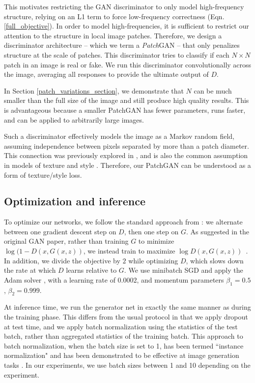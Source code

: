 This motivates restricting the GAN discriminator to only model high-frequency structure, relying on an L1 term to force low-frequency correctness (Eqn. \ref{full_objective}). In order to model high-frequencies, it is sufficient to restrict our attention to the structure in local image patches. Therefore, we design a discriminator architecture -- which we term a \emph{Patch}GAN -- that only penalizes structure at the scale of patches. This discriminator tries to classify if each $N \times N$ patch in an image is real or fake. We run this discriminator convolutionally across the image, averaging all responses to provide the ultimate output of $D$.

In Section \ref{patch_variations_section}, we demonstrate that $N$ can be much smaller than the full size of the image and still produce high quality results. This is advantageous because a smaller PatchGAN has fewer parameters, runs faster, and can be applied to arbitrarily large images.

Such a discriminator effectively models the image as a Markov random field, assuming independence between pixels separated by more than a patch diameter. This connection was previously explored in \cite{li2016precomputed}, and is also the common assumption in models of texture \cite{efros1999texture,gatys2015texture} and style \cite{efros2001image,hertzmann2001image,gatys2015neural,li2016combining}. Therefore, our PatchGAN can be understood as a form of texture/style loss.

\subsection{Optimization and inference}

To optimize our networks, we follow the standard approach from \cite{goodfellow2014generative}: we alternate between one gradient descent step on $D$, then one step on $G$. As suggested in the original GAN paper, rather than training $G$ to minimize $\log(1-D(x,G(x,z))$, we instead train to maximize $\log D(x,G(x,z))$~\cite{goodfellow2014generative}. In addition, we divide the objective by $2$ while optimizing $D$, which slows down the rate at which $D$ learns relative to $G$. We use minibatch SGD and apply the Adam solver \cite{kingma2014adam}, with a learning rate of $0.0002$, and momentum parameters $\beta_1=0.5$, $\beta_2=0.999$.

At inference time, we run the generator net in exactly the same manner as during the training phase. This differs from the usual protocol in that we apply dropout at test time, and we apply batch normalization \cite{ioffe2015batch} using the statistics of the test batch, rather than aggregated statistics of the training batch. This approach to batch normalization, when the batch size is set to 1, has been termed ``instance normalization" and has been demonstrated to be effective at image generation tasks \cite{ulyanov2016instance}. In our experiments, we use batch sizes between 1 and 10 depending on the experiment.

